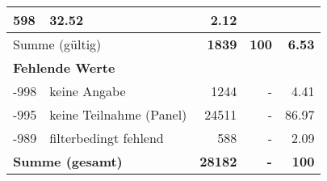 \begin{longtable}{lXrrr}
       \num{598} &
       \num[round-mode=places,round-precision=2]{32.52} &
         \num[round-mode=places,round-precision=2]{2.12} \\
     \midrule
     \multicolumn{2}{l}{Summe (gültig)} &
       \textbf{\num{1839}} &
     \textbf{100} &
       \textbf{\num[round-mode=places,round-precision=2]{6.53}} \\
     \multicolumn{5}{l}{\textbf{Fehlende Werte}}\\
       -998 &
       keine Angabe &
         \num{1244} &
        - &
         \num[round-mode=places,round-precision=2]{4.41} \\
       -995 &
       keine Teilnahme (Panel) &
         \num{24511} &
        - &
         \num[round-mode=places,round-precision=2]{86.97} \\
       -989 &
       filterbedingt fehlend &
         \num{588} &
        - &
         \num[round-mode=places,round-precision=2]{2.09} \\
     \midrule
     \multicolumn{2}{l}{\textbf{Summe (gesamt)}} &
          \textbf{\num{28182}} &
        \textbf{-} &
        \textbf{100} \\
     \bottomrule
     \end{longtable}
     
